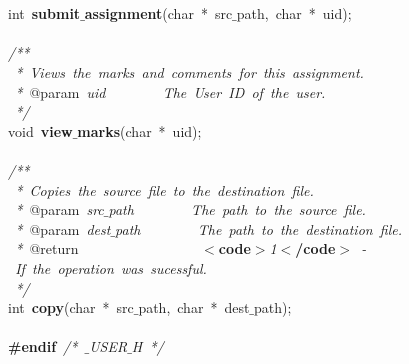 \mbox{} \\
\mbox{} \\
\mbox{}int\ \textbf{submit$\_$assignment}(char\ *\ src$\_$path,\ char\ *\ uid); \\
\mbox{} \\
\mbox{}\textit{/**} \\
\mbox{}\textit{\ *\ Views\ the\ marks\ and\ comments\ for\ this\ assignment.} \\
\mbox{}\textit{\ *\ }@param\textit{\ uid\ \ \ \ \ \ \ \ The\ User\ ID\ of\ the\ user.} \\
\mbox{}\textit{\ */} \\
\mbox{}void\ \textbf{view$\_$marks}(char\ *\ uid); \\
\mbox{} \\
\mbox{}\textit{/**} \\
\mbox{}\textit{\ *\ Copies\ the\ source\ file\ to\ the\ destination\ file.} \\
\mbox{}\textit{\ *\ }@param\textit{\ src$\_$path\ \ \ \ \ \ \ \ The\ path\ to\ the\ source\ file.} \\
\mbox{}\textit{\ *\ }@param\textit{\ dest$\_$path\ \ \ \ \ \ \ \ The\ path\ to\ the\ destination\ file.} \\
\mbox{}\textit{\ *\ }@return\textit{\ \ \ \ \ \ \ \ \ \ \ \ \ \ \ \ \ }\textbf{$<$code$>$}\textit{1}\textbf{$<$/code$>$}\textit{\ -\ If\ the\ operation\ was\ sucessful.} \\
\mbox{}\textit{\ */} \\
\mbox{}int\ \textbf{copy}(char\ *\ src$\_$path,\ char\ *\ dest$\_$path); \\
\mbox{} \\
\mbox{}\textbf{\#endif}\ \textit{/*\ $\_$USER$\_$H\ */} \\

\clearpage
\normalsize
\rmfamily
